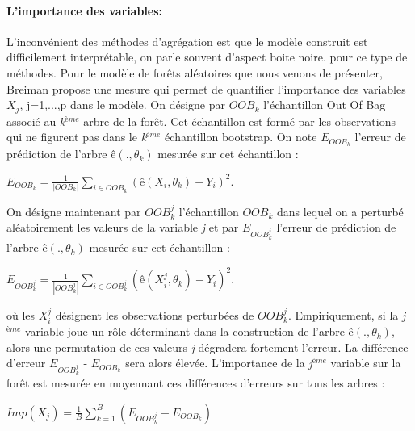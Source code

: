 \paragraph{L'importance des variables:}
	L'inconvénient des méthodes d'agrégation est que le modèle construit est difficilement interprétable, on parle souvent d'aspect boite noire.
	pour ce type de méthodes. Pour le modèle de forêts aléatoires que nous venons de présenter,
	Breiman\cite{BREI01} propose une mesure qui permet de quantifier l'importance des variables $X_j$, j=1,...,p dans le modèle.
	On désigne par $OOB_k$ l'échantillon Out Of Bag associé au \textit{k}$^{ème}$ arbre de la forêt. Cet échantillon est formé par les observations qui ne figurent pas dans le \textit{k}$^{ème}$ échantillon bootstrap. On note $E_{OOB_k}$ l'erreur de prédiction de l'arbre $ê(.,\theta_k)$ mesurée sur cet échantillon :
	\begin{center}
	$E_{OOB_k} = \frac{1}{|OOB_k|} \sum_{i \in OOB_k} (ê(X_i,\theta_k) -Y_i)^2.$
	\end{center}
	On désigne maintenant par $OOB_{k}^{j}$ l'échantillon $OOB_k$ dans lequel on a perturbé aléatoirement
	les valeurs de la variable \textit{j} et par $E_{OOB_{k}^{j}}$ l'erreur de prédiction de l'arbre $ê(.,\theta_k)$ mesurée sur cet échantillon :
	\begin{center}
		$E_{OOB_{k}^{j}} = \frac{1}{|OOB_{k}^{j}|} \sum_{i \in OOB_{k}^{j}} (ê(X_{i}^{j},\theta_k) -Y_i)^2.$
	\end{center}	
	où les $X_{i}^{j}$ désignent les observations perturbées de $OOB_{k}^{j}$. Empiriquement, si la \textit{j}$^{ème}$ variable joue un rôle déterminant dans la construction de l'arbre $ê(.,\theta_k)$, alors une permutation de ces valeurs \textit{j} dégradera fortement l'erreur. La différence d'erreur $E_{OOB_{k}^{j}}$ - $E_{OOB_k}$ sera alors élevée. L'importance de la \textit{j}$^{ème}$ variable sur la forêt est mesurée en moyennant ces différences d'erreurs sur tous les arbres :
	\begin{center}
	${Imp(X_j) = \frac{1}{B} \sum_{k=1}^{B} (E_{OOB_{k}^{j}} - E_{OOB_k}) }$
	\end{center}
	
	
